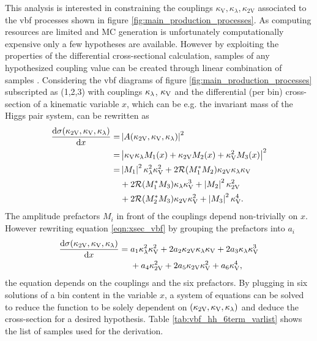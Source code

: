 This analysis is interested in constraining the couplings $\kappa_\text{V},\kappa_\lambda,\kappa_\text{2V}$ associated to the \ac{vbf} processes shown in figure \ref{fig:main_production_processes}. As computing resources are limited and MC generation is unfortunately computationally expensive only a few hypotheses are available. However by exploiting the properties of the differential cross-sectional calculation, samples of any hypothesized coupling value can be created through linear combination of samples \citep{ATLAS-CONF-2019-049}. Considering the \ac{vbf} diagrams of figure \ref{fig:main_production_processes} subscripted as (1,2,3) with couplings $\kappa_\lambda$, $\kappa_\text{V}$ and \ktwov the differential (per bin) cross-section of a kinematic variable $x$, which can be e.g. the invariant mass of the Higgs pair system, can be rewritten as
\begin{align}
    \label{eqn:xsec_vbf}
    \frac{\mathrm{d}\sigma(\kappa_\text{2V}, \kappa_\text{V}, \kappa_\lambda )}{\mathrm{d} x } = &
    \left| A(\kappa_\text{2V}, \kappa_\text{V}, \kappa_\lambda ) \right|^2                                                                                               \\ \nonumber
    =                                                         & \left| \kappa_\text{V} \kappa_\lambda M_1(x    ) + \kappa_\text{2V} M_2(x  ) + \kappa_\text{V}^2 M_3(x   ) \right|^2 \\ \nonumber
    =                                                         & \left\vert M_1\right\vert^2 \kappa_\lambda^2 \kappa_\text{V}^2  + 2 \mathcal{R}(M_{1}^* M_{2})  \kappa_\text{2V} \kappa_\lambda \kappa_\text{V} \\ \nonumber
                                                              & + 2 \mathcal{R}(M_{1}^* M_{3}) \kappa_\lambda \kappa_\text{V}^3 + \left\vert M_2\right\vert^2  \kappa_\text{2V}^2        \\ \nonumber
                                                              & + 2 \mathcal{R}(M_{2}^* M_{3}) \kappa_\text{2V} \kappa_\text{V}^2 + \left\vert M_3\right\vert^2 \kappa_\text{V}^4.
\end{align}
The amplitude prefactors $M_i$ in front of the couplings depend non-trivially on $x$. However
rewriting equation \ref{eqn:xsec_vbf} by grouping the prefactors into $a_i$
\begin{align}\label{eq:reweight}
    \frac{\mathrm{d}\sigma(\kappa_\text{2V}, \kappa_\text{V}, \kappa_\lambda )}{\mathrm{d} x}
    = \; & a_1 \kappa_\lambda^2 \kappa_\text{V}^2  + 2 a_2 \kappa_\text{2V} \kappa_\lambda \kappa_\text{V}  + 2 a_3 \kappa_\lambda \kappa_\text{V}^3  \\
         & + a_4 \kappa_\text{2V}^2     + 2 a_5 \kappa_\text{2V} \kappa_\text{V}^2 + a_6\kappa_\text{V}^4, \nonumber
\end{align}
the equation depends on the couplings and the six prefactors. By plugging in six solutions of a bin content in the variable $x$, a system of equations can be solved to reduce the function to be solely dependent on $(\kappa_\text{2V}, \kappa_\text{V}, \kappa_\lambda )$ and deduce the cross-section for a desired hypothesis. Table \ref*{tab:vbf_hh_6term_varlist} shows the list of samples used for the derivation.
